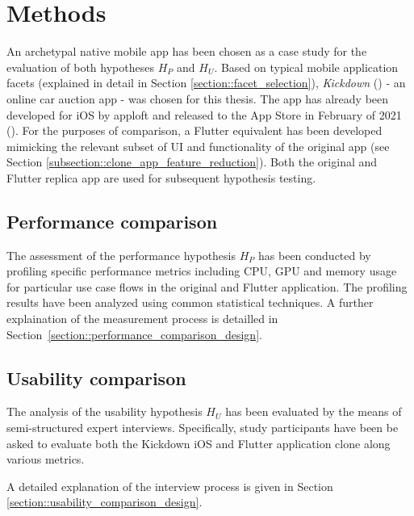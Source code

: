 \section{Methods} \label{section::methods}
An archetypal native mobile app has been chosen as a case study for the evaluation of both hypotheses $H_P$ and $H_U$.
Based on typical mobile application facets (explained in detail in Section \ref{section::facet_selection}), \textit{Kickdown} (\cite{Kickdown2021}) - an online car auction app - was chosen for this thesis. 
The app has already been developed for iOS by apploft and released to the App Store in February of 2021 (\cite{Apple2021e}).
For the purposes of comparison, a Flutter equivalent has been developed mimicking the relevant subset of UI and functionality of the original app (see Section \ref{subsection::clone_app_feature_reduction}). 
Both the original and Flutter replica app are used for subsequent hypothesis testing.


\subsection{Performance comparison}
The assessment of the performance hypothesis $H_P$ has been conducted by profiling specific performance metrics including CPU, GPU and memory usage 
for particular use case flows in the original and Flutter application. 
The profiling results have been analyzed using common statistical techniques.
A further explaination of the measurement process is detailled in Section~\ref{section::performance_comparison_design}.

\subsection{Usability comparison}
The analysis of the usability hypothesis $H_U$ has been evaluated by the means of semi-structured expert interviews.
Specifically, study participants have been be asked to evaluate both the Kickdown iOS and Flutter application clone along various metrics.

A detailed explanation of the interview process is given in Section \ref{section::usability_comparison_design}.

